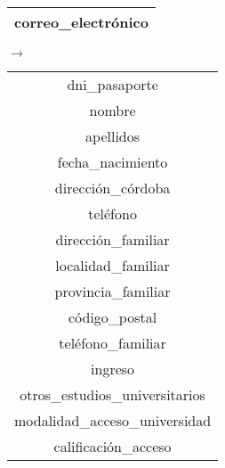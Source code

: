   \begin{center}
    \begin{minipage}{3.7cm}{\begin{tabular}{ | c | }
                  \hline
                  correo\_electrónico \\
                  \hline
                 \end{tabular} }
    \end{minipage}
    \begin{minipage}{0.7cm}{$\longrightarrow$}
    \end{minipage}
    \begin{minipage}{5.9cm}{\begin{tabular}{ | c | }
                  \hline
                  dni\_pasaporte \\
                  nombre \\
                  apellidos \\
                  fecha\_nacimiento \\
                  dirección\_córdoba \\
                  teléfono \\
                  dirección\_familiar \\
                  localidad\_familiar \\
                  provincia\_familiar \\
                  código\_postal \\
                  teléfono\_familiar \\
                  ingreso \\
                  otros\_estudios\_universitarios \\
                  modalidad\_acceso\_universidad \\
                  calificación\_acceso \\
                  \hline
                 \end{tabular} }
    \end{minipage}
  \end{center}

